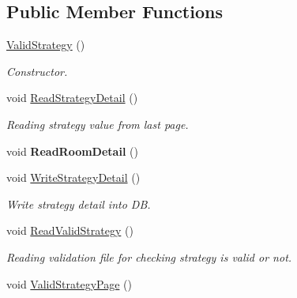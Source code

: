 \subsection*{Public Member Functions}
\begin{DoxyCompactItemize}
\item 
\hypertarget{classValidStrategy_ae168db88ebfa1eabdd7f241a631ffc27}{\hyperlink{classValidStrategy_ae168db88ebfa1eabdd7f241a631ffc27}{Valid\-Strategy} ()}\label{classValidStrategy_ae168db88ebfa1eabdd7f241a631ffc27}

\begin{DoxyCompactList}\small\item\em Constructor. \end{DoxyCompactList}\item 
\hypertarget{classValidStrategy_ae8b17f98d81f8f70d974139086495dfa}{void \hyperlink{classValidStrategy_ae8b17f98d81f8f70d974139086495dfa}{Read\-Strategy\-Detail} ()}\label{classValidStrategy_ae8b17f98d81f8f70d974139086495dfa}

\begin{DoxyCompactList}\small\item\em Reading strategy value from last page. \end{DoxyCompactList}\item 
\hypertarget{classValidStrategy_acf1a8763ec29b441c822a9ab8c80dc4b}{void {\bfseries Read\-Room\-Detail} ()}\label{classValidStrategy_acf1a8763ec29b441c822a9ab8c80dc4b}

\item 
\hypertarget{classValidStrategy_a093620e19cef0865e6e38a26bb41b8bd}{void \hyperlink{classValidStrategy_a093620e19cef0865e6e38a26bb41b8bd}{Write\-Strategy\-Detail} ()}\label{classValidStrategy_a093620e19cef0865e6e38a26bb41b8bd}

\begin{DoxyCompactList}\small\item\em Write strategy detail into D\-B. \end{DoxyCompactList}\item 
\hypertarget{classValidStrategy_a234ca3ab5aa4684306148afa47b6860b}{void \hyperlink{classValidStrategy_a234ca3ab5aa4684306148afa47b6860b}{Read\-Valid\-Strategy} ()}\label{classValidStrategy_a234ca3ab5aa4684306148afa47b6860b}

\begin{DoxyCompactList}\small\item\em Reading validation file for checking strategy is valid or not. \end{DoxyCompactList}\item 
\hypertarget{classValidStrategy_ad89451a935f815b4c85b595135d70d94}{void \hyperlink{classValidStrategy_ad89451a935f815b4c85b595135d70d94}{Valid\-Strategy\-Page} ()}\label{classValidStrategy_ad89451a935f815b4c85b595135d70d94}


\end{DoxyCompactItemize}
